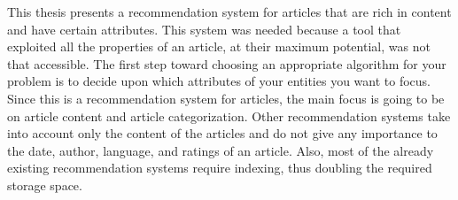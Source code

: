 
This thesis presents a recommendation system for articles that are rich in content and have certain attributes. This system was needed because a tool that exploited all the properties of an article, at their maximum potential, was not that accessible. The first step toward choosing an appropriate algorithm for your problem is to decide upon which attributes of your entities you want to focus. Since this is a recommendation system for articles, the main focus is going to be on article content and article categorization. Other recommendation systems take into account only the content of the articles and do not give any importance to the date, author, language, and ratings of an article. Also, most of the already existing recommendation systems require indexing, thus doubling the required storage space.
